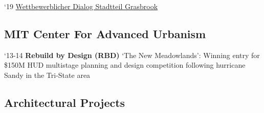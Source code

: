 \begin{tablist}
   \begin{tablist}

      \item[`19] \tab \href{https://www.dropbox.com/sh/ozudl0rm7s78xwp/AAC7h_isLyXeCMCgBAxboDrDa?dl=0}{Wettbewerblicher Dialog Stadtteil Grasbrook}
   \end{tablist}




\end{tablist}


\subsection*{MIT Center For Advanced Urbanism}



\begin{tablist}

   \item[`13-14] \tab \textbf{Rebuild by Design (RBD)}
   {‘The New Meadowlands’: Winning entry for \$150M HUD multistage planning and design competition following hurricane Sandy in the Tri-State area}
\end{tablist}


\subsection*{Architectural Projects}


